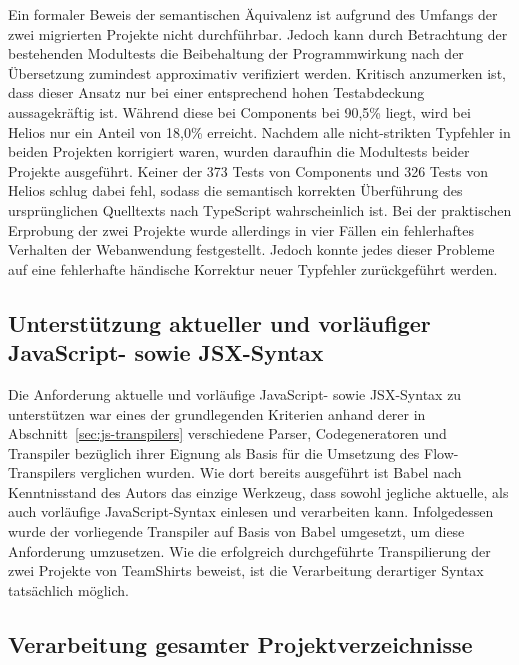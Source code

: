 Ein formaler Beweis der semantischen Äquivalenz ist aufgrund des Umfangs der zwei migrierten Projekte nicht durchführbar. Jedoch kann durch Betrachtung der bestehenden Modultests die Beibehaltung der Programmwirkung nach der Übersetzung zumindest approximativ verifiziert werden. Kritisch anzumerken ist, dass dieser Ansatz nur bei einer entsprechend hohen Testabdeckung aussagekräftig ist. Während diese bei Components bei 90,5\% liegt, wird bei Helios nur ein Anteil von 18,0\% erreicht. Nachdem alle nicht-strikten Typfehler in beiden Projekten korrigiert waren, wurden daraufhin die Modultests beider Projekte ausgeführt. Keiner der 373 Tests von Components und 326 Tests von Helios schlug dabei fehl, sodass die semantisch korrekten Überführung des ursprünglichen Quelltexts nach TypeScript wahrscheinlich ist.
Bei der praktischen Erprobung der zwei Projekte wurde allerdings in vier Fällen ein fehlerhaftes Verhalten der Webanwendung festgestellt. Jedoch konnte jedes dieser Probleme auf eine fehlerhafte händische Korrektur neuer Typfehler zurückgeführt werden.

\subsection{Unterstützung aktueller und vorläufiger JavaScript- sowie JSX-Syntax}

Die Anforderung aktuelle und vorläufige JavaScript- sowie JSX-Syntax zu unterstützen war eines der grundlegenden Kriterien anhand derer in Abschnitt~\ref{sec:js-transpilers} verschiedene Parser, Codegeneratoren und Transpiler bezüglich ihrer Eignung als Basis für die Umsetzung des Flow-Transpilers verglichen wurden. Wie dort bereits ausgeführt ist Babel nach Kenntnisstand des Autors das einzige Werkzeug, dass sowohl jegliche aktuelle, als auch vorläufige JavaScript-Syntax einlesen und verarbeiten kann. Infolgedessen wurde der vorliegende Transpiler auf Basis von Babel umgesetzt, um diese Anforderung umzusetzen. Wie die erfolgreich durchgeführte Transpilierung der zwei Projekte von TeamShirts beweist, ist die Verarbeitung derartiger Syntax tatsächlich möglich.



\subsection{Verarbeitung gesamter Projektverzeichnisse}

